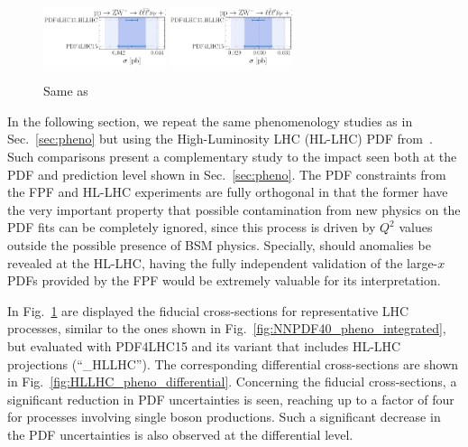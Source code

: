 \begin{figure}[!h]
	\includegraphics[width=0.32\textwidth]{plots/LHCpheno/NNPDF_WPZ_14TEV_40_PHENO-integrated-HLLHC.pdf}
	\includegraphics[width=0.32\textwidth]{plots/LHCpheno/NNPDF_WMZ_14TEV_40_PHENO-integrated-HLLHC.pdf}
	\caption{Same as}
	\label{fig:HLLHC_pheno_integrated}
\end{figure}

In the following section, we repeat the same phenomenology studies as in
Sec.~\ref{sec:pheno} but using the High-Luminosity LHC (HL-LHC) PDF 
from~\cite{AbdulKhalek:2018rok}.
%
Such comparisons present a complementary study to the impact seen both at the PDF 
and prediction level shown in Sec.~\ref{sec:pheno}. The PDF constraints from the 
FPF and HL-LHC experiments are fully orthogonal in that the former have the very 
important property that possible contamination from new physics on the PDF fits 
can be completely ignored, since this process is driven by $Q^2$ values outside 
the possible presence of BSM physics.
%
Specially, should anomalies be revealed at the HL-LHC, having the fully independent
validation of the large-$x$ PDFs provided by the FPF would be extremely valuable 
for its interpretation.

In Fig.~\ref{fig:HLLHC_pheno_integrated} are displayed the fiducial cross-sections for 
representative LHC processes, similar to the ones shown in Fig.~\ref{fig:NNPDF40_pheno_integrated},
but evaluated with PDF4LHC15 and its variant that includes HL-LHC projections (``\_HLLHC'').
The corresponding differential cross-sections are shown in Fig.~\ref{fig:HLLHC_pheno_differential}.
%
Concerning the fiducial cross-sections, a significant reduction in PDF uncertainties
is seen, reaching up to a factor of four for processes involving single boson productions. 
Such a significant decrease in the PDF uncertainties is also observed at the differential
level.



